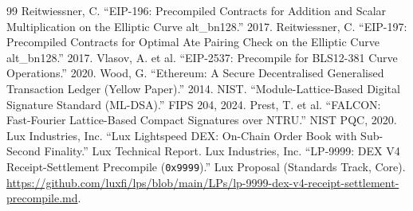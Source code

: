 \begin{thebibliography}{99}
 Reitwiessner, C. ``EIP-196: Precompiled Contracts for Addition and Scalar Multiplication on the Elliptic Curve alt\_bn128.'' 2017.
 Reitwiessner, C. ``EIP-197: Precompiled Contracts for Optimal Ate Pairing Check on the Elliptic Curve alt\_bn128.'' 2017.
 Vlasov, A. et al. ``EIP-2537: Precompile for BLS12-381 Curve Operations.'' 2020.
 Wood, G. ``Ethereum: A Secure Decentralised Generalised Transaction Ledger (Yellow Paper).'' 2014.
 NIST. ``Module-Lattice-Based Digital Signature Standard (ML-DSA).'' FIPS 204, 2024.
 Prest, T. et al. ``FALCON: Fast-Fourier Lattice-Based Compact Signatures over NTRU.'' NIST PQC, 2020.
 Lux Industries, Inc. ``Lux Lightspeed DEX: On-Chain Order Book with Sub-Second Finality.'' Lux Technical Report.
 Lux Industries, Inc. ``LP-9999: DEX V4 Receipt-Settlement Precompile (\texttt{0x9999}).'' Lux Proposal (Standards Track, Core). \url{https://github.com/luxfi/lps/blob/main/LPs/lp-9999-dex-v4-receipt-settlement-precompile.md}.
\end{thebibliography}

